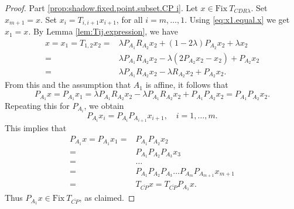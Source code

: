 \documentclass[12pt]{article}
\theoremstyle{definition}
\newcommand{\Fix}{\mathrm{Fix}\ }
\begin{document}
\begin{proof}
Part \eqref{prop:shadow.fixed.point.subset.CP i}.  Let $x\in\Fix T_{CDR\lambda}$.
Set $x_{m+1}=x$. Set $x_i=T_{i,i+1}x_{i+1}$, for all $i=m,\dots,1$. Using \eqref{eq:x1.equal.x} we get $x_1=x$.
By Lemma \ref{lem:Tij.expression}, we have
\begin{equation}\label{eq:rep.x}
    \begin{array}{rl}
         x=x_1=T_{1,2}x_2 =&\lambda P_{A_1}R_{A_2}x_2+(1-2\lambda)P_{A_2}x_2+\lambda x_2 \\
         =& \lambda P_{A_1}R_{A_2}x_2-\lambda(2P_{A_2}x_2-x_2)+P_{A_2}x_2\\
         =&\lambda P_{A_1}R_{A_2}x_2-\lambda R_{A_2}x_2+P_{A_2}x_2.
    \end{array}
\end{equation}
From this and the assumption that $A_1$ is affine, it follows that
\begin{equation}\label{eq:PA1x.equal.PA1PA2x}
    P_{A_1}x=P_{A_1}x_1=\lambda P_{A_1}R_{A_2}x_2-\lambda P_{A_1} R_{A_2}x_2+P_{A_1}P_{A_2}x_2=P_{A_1}P_{A_2}x_2.
\end{equation}
Repeating this for $P_{A_i}$, we obtain
\begin{equation}
    P_{A_i}x_i = P_{A_i}P_{A_{i+1}}x_{i+1}, \quad  i=1,\dots,m.
\end{equation}
This implies that
\begin{equation}
    \begin{array}{rl}
         P_{A_1}x=P_{A_1}x_1=& P_{A_1}P_{A_2}x_2\\ =&P_{A_1}P_{A_2}P_{A_3}x_3\\
         =& \dots\\
        =&P_{A_1}P_{A_2}P_{A_3}\dots P_{A_m}P_{A_{m+1}}x_{m+1}\\
        =&T_{\overline{CP}}x = T_{\overline{CP}}P_{A_1}x.
    \end{array}
\end{equation}
Thus $P_{A_1}x\in\Fix  T_{\overline{CP}}$, as claimed.


\end{proof}
\end{document}

